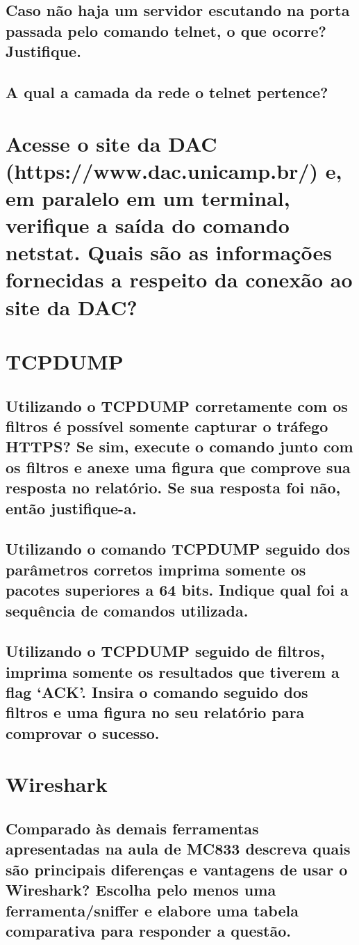 \documentclass[12pt,a4paper]{report}
\begin{document}
\subsection{Caso não haja um servidor escutando na porta passada pelo comando telnet, o que ocorre? Justifique.}
\subsection{A qual a camada da rede o telnet pertence?}

\section{Acesse o site da DAC (https://www.dac.unicamp.br/) e, em paralelo em um terminal, verifique a saída do comando netstat. Quais são as informações fornecidas a respeito da conexão ao site da DAC?}

\section{TCPDUMP}
\subsection{Utilizando o TCPDUMP corretamente com os filtros é possível somente capturar o tráfego HTTPS? Se sim, execute o comando junto com os filtros e anexe uma figura que comprove sua resposta no relatório. Se sua resposta foi não, então justifique-a.}
\subsection{Utilizando o comando TCPDUMP seguido dos parâmetros corretos imprima somente os pacotes superiores a 64 bits. Indique qual foi a sequência de comandos utilizada.}
\subsection{Utilizando o TCPDUMP seguido de filtros, imprima somente os resultados que tiverem a flag ‘ACK’. Insira o comando seguido dos filtros e uma figura no seu relatório para comprovar o sucesso.}

\section{Wireshark}


\subsection{Comparado às demais ferramentas apresentadas na aula de MC833 descreva quais são principais diferenças e vantagens de usar o Wireshark? Escolha pelo menos uma ferramenta/sniffer e elabore uma tabela comparativa para responder a questão.}
\end{document}
